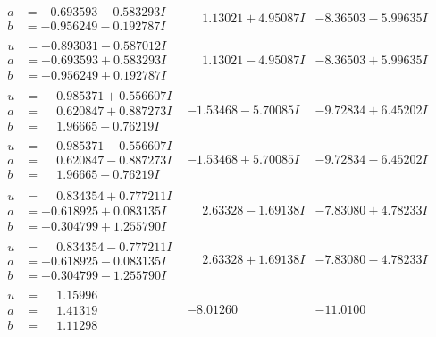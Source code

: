\documentclass[1p]{elsarticle_modified}
\theoremstyle{definition}
\begin{document}
$$\begin{array}{c|c|c}
\begin{aligned}
a &= -0.693593 - 0.583293 I \\
b &= -0.956249 - 0.192787 I\end{aligned}
 & \phantom{-}1.13021 + 4.95087 I & -8.36503 - 5.99635 I \\ \hline\begin{aligned}
u &= -0.893031 - 0.587012 I \\
a &= -0.693593 + 0.583293 I \\
b &= -0.956249 + 0.192787 I\end{aligned}
 & \phantom{-}1.13021 - 4.95087 I & -8.36503 + 5.99635 I \\ \hline\begin{aligned}
u &= \phantom{-}0.985371 + 0.556607 I \\
a &= \phantom{-}0.620847 + 0.887273 I \\
b &= \phantom{-}1.96665 - 0.76219 I\end{aligned}
 & -1.53468 - 5.70085 I & -9.72834 + 6.45202 I \\ \hline\begin{aligned}
u &= \phantom{-}0.985371 - 0.556607 I \\
a &= \phantom{-}0.620847 - 0.887273 I \\
b &= \phantom{-}1.96665 + 0.76219 I\end{aligned}
 & -1.53468 + 5.70085 I & -9.72834 - 6.45202 I \\ \hline\begin{aligned}
u &= \phantom{-}0.834354 + 0.777211 I \\
a &= -0.618925 + 0.083135 I \\
b &= -0.304799 + 1.255790 I\end{aligned}
 & \phantom{-}2.63328 - 1.69138 I & -7.83080 + 4.78233 I \\ \hline\begin{aligned}
u &= \phantom{-}0.834354 - 0.777211 I \\
a &= -0.618925 - 0.083135 I \\
b &= -0.304799 - 1.255790 I\end{aligned}
 & \phantom{-}2.63328 + 1.69138 I & -7.83080 - 4.78233 I \\ \hline\begin{aligned}
u &= \phantom{-}1.15996\phantom{ +0.000000I} \\
a &= \phantom{-}1.41319\phantom{ +0.000000I} \\
b &= \phantom{-}1.11298\phantom{ +0.000000I}\end{aligned}
 & -8.01260\phantom{ +0.000000I} & -11.0100\phantom{ +0.000000I} \\ \hline\begin{aligned}

\end{aligned}
\end{array}$$
\end{document}
